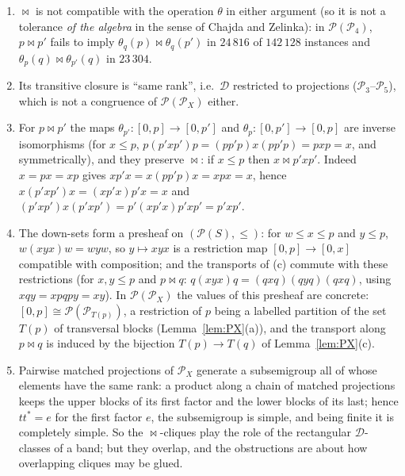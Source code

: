 \documentclass[11pt]{amsart}
\theoremstyle{definition}
\newcommand{\D}{\mathcal{D}}
\renewcommand{\P}{\mathcal{P}}
\begin{document}
\begin{enumerate}[nosep,label=(\alph*)]
\item $\bowtie$ is not compatible with the operation $\theta$ in either argument (so it is not a tolerance \emph{of the algebra} in the sense of Chajda and Zelinka): in $\P(\P_4)$, $p\bowtie p'$ fails to imply $\theta_q(p)\bowtie\theta_q(p')$ in $24\,816$ of $142\,128$ instances and $\theta_p(q)\bowtie\theta_{p'}(q)$ in $23\,304$.
\item Its transitive closure is ``same rank'', i.e.\ $\D$ restricted to projections ($\P_3$--$\P_5$), which is not a congruence of $\P(\P_X)$ either.
\item For $p\bowtie p'$ the maps $\theta_{p'}\colon[0,p]\to[0,p']$ and $\theta_p\colon[0,p']\to[0,p]$ are inverse isomorphisms (for $x\le p$, $p(p'xp')p=(pp'p)x(pp'p)=pxp=x$, and symmetrically), and they preserve $\bowtie$: if $x\le p$ then $x\bowtie p'xp'$. Indeed $x=px=xp$ gives $xp'x=x(pp'p)x=xpx=x$, hence $x(p'xp')x=(xp'x)p'x=x$ and $(p'xp')x(p'xp')=p'(xp'x)p'xp'=p'xp'$.
\item The down-sets form a presheaf on $(\P(S),\le)$: for $w\le x\le p$ and $y\le p$, $w(xyx)w=wyw$, so $y\mapsto xyx$ is a restriction map $[0,p]\to[0,x]$ compatible with composition; and the transports of (c) commute with these restrictions (for $x,y\le p$ and $p\bowtie q$: $q(xyx)q=(qxq)(qyq)(qxq)$, using $xqy=xpqpy=xy$). In $\P(\P_X)$ the values of this presheaf are concrete: $[0,p]\cong\P(\P_{T(p)})$, a restriction of $p$ being a labelled partition of the set $T(p)$ of transversal blocks (Lemma~\ref{lem:PX}(a)), and the transport along $p\bowtie q$ is induced by the bijection $T(p)\to T(q)$ of Lemma~\ref{lem:PX}(c).
\item Pairwise matched projections of $\P_X$ generate a subsemigroup all of whose elements have the same rank: a product along a chain of matched projections keeps the upper blocks of its first factor and the lower blocks of its last; hence $tt^*=e$ for the first factor $e$, the subsemigroup is simple, and being finite it is completely simple. So the $\bowtie$-cliques play the role of the rectangular $\D$-classes of a band; but they overlap, and the obstructions are about how overlapping cliques may be glued.
\end{enumerate}
\end{document}
